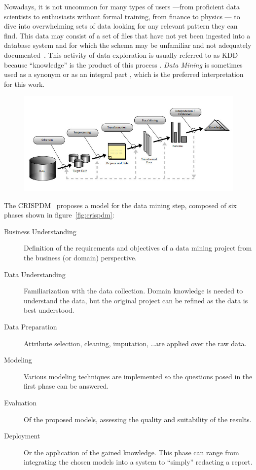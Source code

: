 
Nowadays, it is not uncommon for many types of users
---from proficient data scientists to enthusiasts without formal
training, from finance to physics --- to dive into overwhelming
sets of data looking for any relevant pattern they can find. This data
may consist of a set of files that have not yet been ingested into a
database system and for which the schema may be unfamiliar and not
adequately documented~\cite{hey2009the}.
This activity of data exploration is usually referred to as \gls{KDD}
because ``knowledge'' is the product of this process
\parencite{Piatetsky-Shapiro1991,Fayyad1996a}.
\emph{Data Mining} is sometimes used as a synonym or as an integral
part \parencite{Fayyad1996a,Reinartz1999}, which is
the preferred interpretation for this work.

\begin{figure}[htbp]
    \centering
    \includegraphics[width=\linewidth]{images/1_introduction/kdd.jpg}
    \caption{}
    \label{fig:kdd}
\end{figure}

The \gls{CRISPDM}~\cite{Shearer2000} proposes a model for the data
mining step, composed of six phases shown in figure~\ref{fig:crispdm}:

\begin{description}
    \item[Business Understanding] Definition of the requirements and objectives of a data mining project
        from the business (or domain) perspective.
    \item[Data Understanding] Familiarization with the data collection. Domain knowledge
        is needed to understand the data, but the original project can be refined as the data is best understood.
    \item[Data Preparation] Attribute selection, cleaning, imputation, \ldots are applied over the raw data.
    \item[Modeling] Various modeling techniques are implemented so the questions posed in the first phase
        can be answered.
    \item[Evaluation] Of the proposed models, assessing the quality and suitability of the results.
    \item[Deployment] Or the application of the gained knowledge. This phase can range from integrating
    the chosen models into a system to ``simply'' redacting a report.
\end{description}

